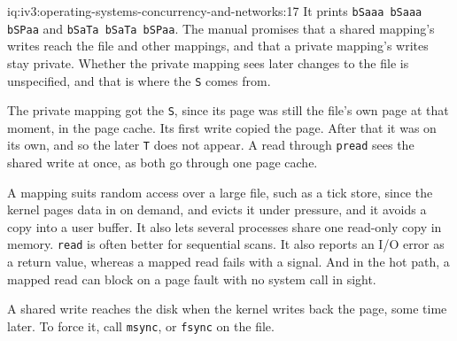 \begin{solution}{iq:iv3:operating-systems-concurrency-and-networks:17}
It prints \texttt{b\textquotesingle{}Saaa\textquotesingle{} b\textquotesingle{}Saaa\textquotesingle{} b\textquotesingle{}SPaa\textquotesingle{}} and \texttt{b\textquotesingle{}SaTa\textquotesingle{} b\textquotesingle{}SaTa\textquotesingle{} b\textquotesingle{}SPaa\textquotesingle{}}. The manual promises that a shared mapping's writes reach the file and other mappings, and that a private mapping's writes stay private. Whether the private mapping sees later changes to the file is unspecified, and that is where the \texttt{S} comes from.

The private mapping got the \texttt{S}, since its page was still the file's own page at that moment, in the page cache. Its first write copied the page. After that it was on its own, and so the later \texttt{T} does not appear. A read through \texttt{pread} sees the shared write at once, as both go through one page cache.

A mapping suits random access over a large file, such as a tick store, since the kernel pages data in on demand, and evicts it under pressure, and it avoids a copy into a user buffer. It also lets several processes share one read-only copy in memory. \texttt{read} is often better for sequential scans. It also reports an I/O error as a return value, whereas a mapped read fails with a signal. And in the hot path, a mapped read can block on a page fault with no system call in sight.

A shared write reaches the disk when the kernel writes back the page, some time later. To force it, call \texttt{msync}, or \texttt{fsync} on the file.

\end{solution}

